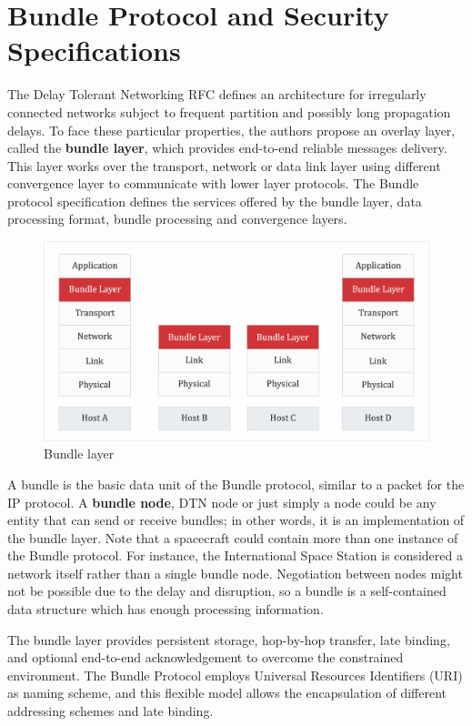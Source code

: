 \section{Bundle Protocol and Security Specifications}
\label{sec:dtn}

The Delay Tolerant Networking RFC \cite{cerf2007delay} defines an architecture for irregularly connected networks subject to frequent partition and possibly long propagation delays. To face these particular properties, the authors propose an overlay layer, called the \textbf{bundle layer}, which provides end-to-end reliable messages delivery. This layer works over the transport, network or data link layer using different convergence layer to communicate with lower layer protocols. The Bundle protocol specification \cite{rfc5050} defines the services offered by the bundle layer, data processing format, bundle processing and convergence layers. 

\begin{figure}[ht]
\centering
\includegraphics[width=1 \linewidth]{images/bundle.png} 
\caption{Bundle layer}
\label{fig:bundle}
\end{figure}

A bundle is the basic data unit of the Bundle protocol, similar to a packet for the IP protocol. A \textbf{bundle node}, DTN node or just simply a node could be any entity that can send or receive bundles; in other words, it is an implementation of the bundle layer. Note that a spacecraft could contain more than one instance of the Bundle protocol. For instance, the International Space Station is considered a network itself rather than a single bundle node. Negotiation between nodes might not be possible due to the delay and disruption, so a bundle is a self-contained data structure which has enough processing information.


The bundle layer provides persistent storage, hop-by-hop transfer, late binding, and optional end-to-end acknowledgement to overcome the constrained environment. The Bundle Protocol employs Universal Resources Identifiers (URI) as naming scheme, and this flexible model allows the encapsulation of different addressing schemes and late binding. 

